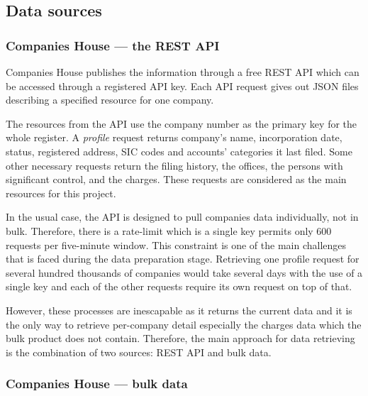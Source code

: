 \documentclass[ %
                    author={Natchalin Iwsakul \\ Inkaphol Siriwongwattana \\ Tanaphan Kummaraphat \\ Patorn Srisupap},
                supervisor={Fernando Moreno-Pino},
                    degree={MSc},
                     title={Propensity Modelling for SME Commercial Lending Using Open Public Data},
                  subtitle={Companies House filings and GDELT media coverage as predictors of first-time borrowing},
                      type={},
                      year={2026}]{dissertation}
\begin{document}
\subsection{Data sources}
\label{sec:datasources}

\subsubsection{Companies House --- the REST API}
\label{sec:ch-api}

Companies House publishes the information through a free REST API which can be accessed through a registered API key. Each API request gives out JSON files describing a specified resource for one company.

The resources from the API use the company number as the primary key for the whole register. A \textit{profile} request returns company's name, incorporation date, status, registered address, SIC codes and accounts' categories it last filed. Some other necessary requests return the filing history, the offices, the persons with significant control, and the charges. These requests are considered as the main resources for this project.

In the usual case, the API is designed to pull companies data individually, not in bulk. Therefore, there is a rate-limit which is a single key permits only 600 requests per five-minute window. This constraint is one of the main challenges that is faced during the data preparation stage. Retrieving one profile request for several hundred thousands of companies would take several days with the use of a single key and each of the other requests require its own request on top of that.

However, these processes are inescapable as it returns the current data and it is the only way to retrieve per-company detail especially the charges data which the bulk product does not contain. Therefore, the main approach for data retrieving is the combination of two sources: REST API and bulk data.

\subsubsection{Companies House --- bulk data}
\label{sec:ch-bulk}
\end{document}
